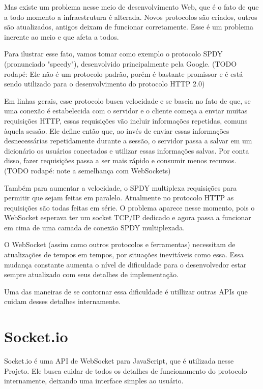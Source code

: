 \documentclass[a4paper,12pt]{article}
\begin{document}
Mas existe um problema nesse meio de desenvolvimento Web, que é o fato de que a todo momento a infraestrutura é alterada. Novos protocolos são criados, outros são atualizados, antigos deixam de funcionar corretamente. Esse é um problema inerente ao meio e que afeta a todos.

Para ilustrar esse fato, vamos tomar como exemplo o protocolo SPDY (pronunciado "speedy"), desenvolvido principalmente pela Google. (TODO rodapé: Ele não é um protocolo padrão, porém é bastante promissor e é está sendo utilizado para o desenvolvimento do protocolo HTTP 2.0)

Em linhas gerais, esse protocolo busca velocidade e se baseia no fato de que, se uma conexão é estabelecida com o servidor e o cliente começa a enviar muitas requisições HTTP, essas requisições vão incluir informações repetidas, comuns àquela sessão. Ele define então que, ao invés de enviar essas informações desnecessárias repetidamente durante a sessão, o servidor passa a salvar em um dicionário os usuários conectados e utilizar essas informações salvas. Por conta disso, fazer requisições passa a ser mais rápido e consumir menos recursos. (TODO rodapé: note a semelhança com WebSockets)

Também para aumentar a velocidade, o SPDY multiplexa requisições para permitir que sejam feitas em paralelo. Atualmente no protocolo HTTP as requisições são todas feitas em série. O problema aparece nesse momento, pois o WebSocket esperava ter um socket TCP/IP dedicado e agora passa a funcionar em cima de uma camada de conexão SPDY multiplexada.

O WebSocket (assim como outros protocolos e ferramentas) necessitam de  atualizações de tempos em tempos, por situações inevitáveis como essa. Essa mudança constante aumenta o nível de dificuldade para o desenvolvedor estar sempre atualizado com seus detalhes de implementação.

Uma das maneiras de se contornar essa dificuldade é utillizar outras APIs que cuidam desses detalhes internamente.


\section{Socket.io}


Socket.io é uma API de WebSocket para JavaScript, que é utilizada nesse Projeto. Ele busca cuidar de todos os detalhes de funcionamento do protocolo internamente, deixando uma interface simples ao usuário.
\end{document}

